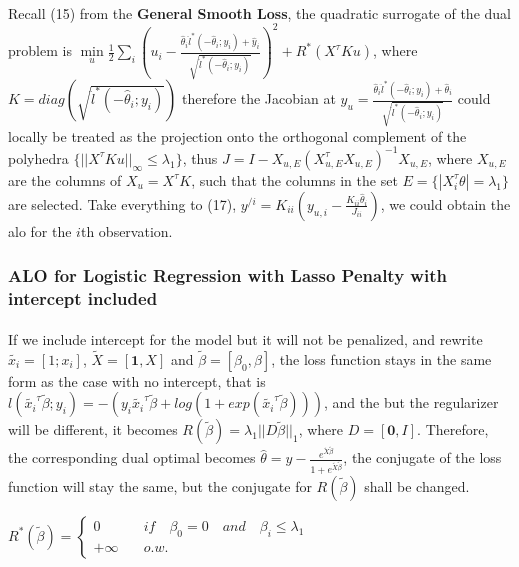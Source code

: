 \documentclass{article}
\begin{document}
\paragraph{}Recall (15) from the \textbf{General Smooth Loss}, the quadratic surrogate of the dual problem is $\min\limits_{u} \frac{1}{2}\sum\limits_{i}(u_{i}-\frac{\hat{\theta}_{i}\ddot{l}^{*}(-\hat{\theta}_{i};y_{i})+\hat{y}_{i}}{\sqrt{\ddot{l}^{*}(-\hat{\theta}_{i};y_{i})}})^{2}+R^{*}(X^{\tau}Ku)$, where $K =diag(\sqrt{\ddot{l}^{*}(-\hat{\theta}_{i};y_{i})})$ therefore the Jacobian at $y_{u} = \frac{\hat{\theta}_{i}\ddot{l}^{*}(-\hat{\theta}_{i};y_{i})+\hat{\theta}_{i}}{\sqrt{\ddot{l}^{*}(-\hat{\theta}_{i};y_{i})}}$ could locally be treated as the projection onto the orthogonal complement of the polyhedra $\{||X^{\tau}Ku||_{\infty} \leq \lambda_{1}\}$, thus $J = I - X_{u,E}(X_{u,E}^{\tau}X_{u,E})^{-1}X_{u,E}$, where $X_{u,E}$ are the columns of $X_{u}=X^{\tau}K$, such that the columns in the set $E = \{|X_{i}^{\tau}\theta| = \lambda_{1}\}$ are selected. Take everything to (17), $y^{/i} = K_{ii}(y_{u,i}-\frac{K_{ii}\hat{\theta}_{i}}{J_{ii}})$, we could obtain the alo for the $i$th observation.
\subsubsection{ALO for Logistic Regression with Lasso Penalty with intercept included}
\paragraph{}If we include intercept for the model but it will not be penalized, and rewrite $\tilde{x_{i}} = [1; x_{i}]$, $\tilde{X} = [
\textbf{1},X]$ and $\tilde{\beta} = [\beta_{0},\beta]$, the loss function stays in the same form as the case with no intercept, that is $l(\tilde{x_{i}}^{\tau}\tilde{\beta};y_{i})= -(y_{i}\tilde{x_{i}}^{\tau}\tilde{\beta}+log(1+exp(\tilde{x_{i}}^{\tau}\tilde{\beta})))$, and the but the regularizer will be different, it becomes $R(\tilde{\beta}) = \lambda_{1}||D\tilde{\beta}||_{1}$, where $D = [\textbf{0},I]$. Therefore, the corresponding dual optimal becomes $\hat{\theta} = y - \frac{e^{\tilde{X}\tilde{\beta}}}{1+e^{\tilde{X}\tilde{\beta}}}$, the conjugate of the loss function will stay the same, but the conjugate for $R(\tilde{\beta})$ shall be changed.
\begin{center}
$R^{*}(\tilde{\beta}) = \left\{
\begin{aligned}
0 & \quad if \quad \beta_{0} = 0 \quad and \quad \beta_{i} \leq \lambda_{1}\\
+\infty & \quad o.w.
\end{aligned}
\right.$
\end{center}
\end{document}
